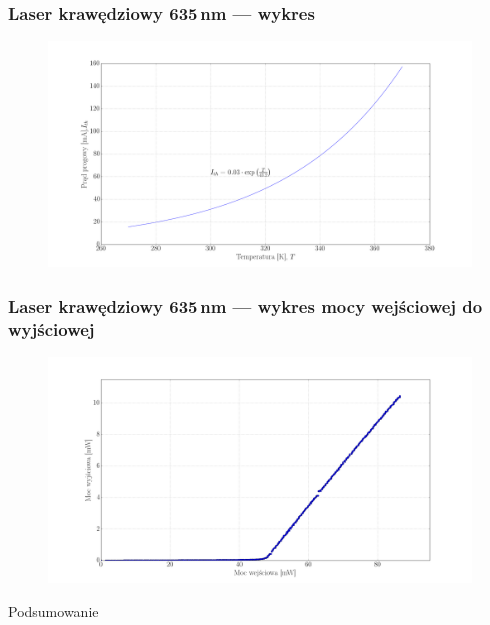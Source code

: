 \documentclass[xcolor={dvipsnames,table}]{beamer}
\begin{document}
\begin{frame}
\frametitle{Laser krawędziowy 635\,nm --- wykres}
\center
\begin{figure}
   \includegraphics[width=1.10\textwidth,natwidth=69,natheight=87]{635/plot_i_th_temp.png}
\end{figure}
\end{frame}

\begin{frame}
\frametitle{Laser krawędziowy 635\,nm --- wykres mocy wejściowej do wyjściowej}
\center
\begin{figure}
   \includegraphics[width=1.10\textwidth,natwidth=69,natheight=87]{635/plot_power_20.png}
\end{figure}

\end{frame}

\begin{frame}
\begin{Huge}
\begin{center}
Podsumowanie
\end{center}
\end{Huge}
\end{frame}
\end{document}
